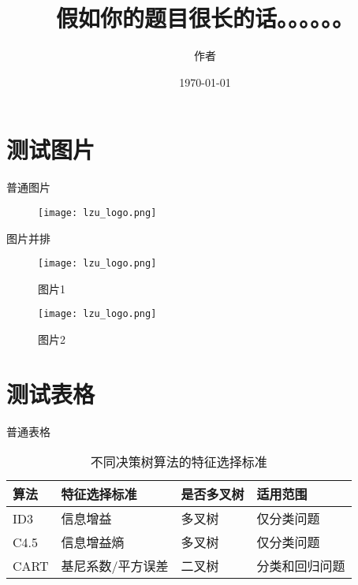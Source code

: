 \documentclass{ldr-simple-gray}
\title{假如你的题目很长的话。。。。。。}
\author{作者}
\institute[]
{
}
\date{\today}
\begin{document}
\frame{\titlepage}




\section{测试图片}

\begin{frame}{普通图片}

\begin{figure}
    \texttt{[image: lzu\_logo.png]}
\end{figure}
\end{frame}
\begin{frame}{图片并排}
  \begin{figure}[htbp]
  \begin{minipage}[t]{0.45\linewidth}
      \texttt{[image: lzu\_logo.png]}
      \caption{图片1}  
  \end{minipage}
  \begin{minipage}[t]{0.45\linewidth}
      \texttt{[image: lzu\_logo.png]}
      \caption{图片2}   
  \end{minipage}
  \end{figure}
  \end{frame}

\section{测试表格}

\begin{frame}{普通表格}
  \begin{table}[htbp]
    \centering
    \caption{不同决策树算法的特征选择标准}
    \begin{tabular}{llll}
      \toprule
      \toprule
      算法    & 特征选择标准  & 是否多叉树 & 适用范围\\
      \midrule
      ID3  & 信息增益   & 多叉树 & 仅分类问题\\
      C4.5  & 信息增益熵 & 多叉树 & 仅分类问题\\
      CART  & 基尼系数/平方误差 & 二叉树 & 分类和回归问题\\
      \bottomrule
      \bottomrule
    \end{tabular}%

  \end{table}%
\end{frame}
\end{document}
